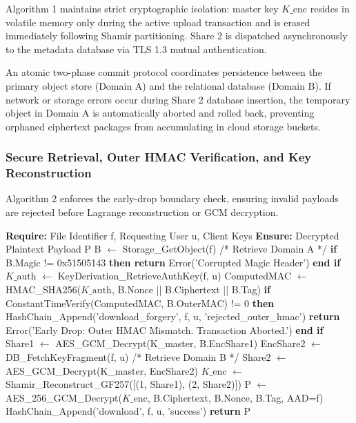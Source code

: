 \documentclass[5p,times]{elsarticle}
\begin{document}
Algorithm 1 maintains strict cryptographic isolation: master key $K\_{\text{enc}}$ resides in volatile memory only during the active upload transaction and is erased immediately following Shamir partitioning. Share 2 is dispatched asynchronously to the metadata database via TLS 1.3 mutual authentication.

An atomic two-phase commit protocol coordinates persistence between the primary object store (Domain A) and the relational database (Domain B). If network or storage errors occur during Share 2 database insertion, the temporary object in Domain A is automatically aborted and rolled back, preventing orphaned ciphertext packages from accumulating in cloud storage buckets.


\subsubsection{Secure Retrieval, Outer HMAC Verification, and Key Reconstruction}

Algorithm 2 enforces the early-drop boundary check, ensuring invalid payloads are rejected before Lagrange reconstruction or GCM decryption.

\begin{algorithm}[!ht]
\caption{Secure Retrieval, Outer HMAC Verification, and Key Reconstruction Protocol}
\begin{algorithmic}[1]
  \STATE \textbf{Require:} File Identifier f, Requesting User u, Client Keys
  \STATE \textbf{Ensure:} Decrypted Plaintext Payload P
  \STATE B $\leftarrow$ Storage\_GetObject(f) /* Retrieve Domain A */
  \STATE \textbf{if} B.Magic != 0x51505143 \textbf{then return} Error('Corrupted Magic Header') \textbf{end if}
  \STATE $K\_{\text{auth}}$ $\leftarrow$ KeyDerivation\_RetrieveAuthKey(f, u)
  \STATE ComputedMAC $\leftarrow$ HMAC\_SHA256($K\_{\text{auth}}$, B.Nonce || B.Ciphertext || B.Tag)
  \STATE \textbf{if} ConstantTimeVerify(ComputedMAC, B.OuterMAC) != 0 \textbf{then}
  \STATE HashChain\_Append('download\_forgery', f, u, 'rejected\_outer\_hmac')
  \STATE \textbf{return} Error('Early Drop: Outer HMAC Mismatch. Transaction Aborted.')
  \STATE \textbf{end if}
  \STATE Share1 $\leftarrow$ AES\_GCM\_Decrypt(K\_master, B.EncShare1)
  \STATE EncShare2 $\leftarrow$ DB\_FetchKeyFragment(f, u) /* Retrieve Domain B */
  \STATE Share2 $\leftarrow$ AES\_GCM\_Decrypt(K\_master, EncShare2)
  \STATE $K\_{\text{enc}}$ $\leftarrow$ Shamir\_Reconstruct\_GF257([(1, Share1), (2, Share2)])
  \STATE P $\leftarrow$ AES\_256\_GCM\_Decrypt($K\_{\text{enc}}$, B.Ciphertext, B.Nonce, B.Tag, AAD=f)
  \STATE HashChain\_Append('download', f, u, 'success')
  \STATE \textbf{return} P
\end{algorithmic}
\end{algorithm}
\end{document}
